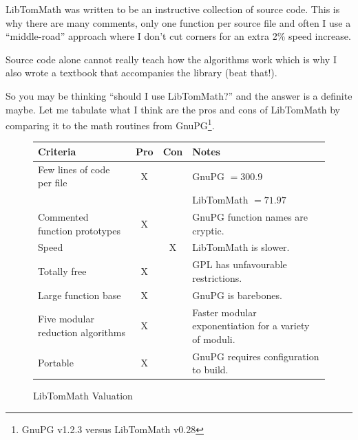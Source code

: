 \documentclass[synpaper]{book}
\begin{document}
LibTomMath was written to be an instructive collection of source code.	This is why there are many
comments, only one function per source file and often I use a ``middle-road'' approach where I
don't cut corners for an extra 2\% speed increase.

Source code alone cannot really teach how the algorithms work which is why I also wrote a textbook
that accompanies the library (beat that!).

So you may be thinking ``should I use LibTomMath?'' and the answer is a definite maybe.  Let me
tabulate what I think are the pros and cons of LibTomMath by comparing it to the math routines from
GnuPG\footnote{GnuPG v1.2.3 versus LibTomMath v0.28}.

\newpage\begin{figure}[h]
  \begin{small}
    \begin{center}
      \begin{tabular}{|p{4.5cm}|c|c|p{4.5cm}|}
        \hline \textbf{Criteria}                 & \textbf{Pro} & \textbf{Con} & \textbf{Notes}
        \\
        \hline Few lines of code per file        & X            &              & GnuPG $ = 300.9$
        \\
                                                 &              &              & LibTomMath	$ =
          71.97$\hfill
        \\
        \hline Commented function prototypes     & X            &              & GnuPG function
        names are cryptic.
        \\
        \hline Speed                             &              & X            & LibTomMath is
        slower.
        \\
        \hline Totally free                      & X            &              & GPL has
        unfavourable restrictions.
        \\
        \hline Large function base               & X            &              & GnuPG is
        barebones.
        \\
        \hline Five modular reduction algorithms & X            &              & Faster modular
        exponentiation for a variety of
        moduli.
        \\
        \hline Portable                          & X            &              & GnuPG requires
        configuration to build.
        \\
        \hline
      \end{tabular}
    \end{center}
  \end{small}
  \caption{LibTomMath Valuation}
\end{figure}
\end{document}
